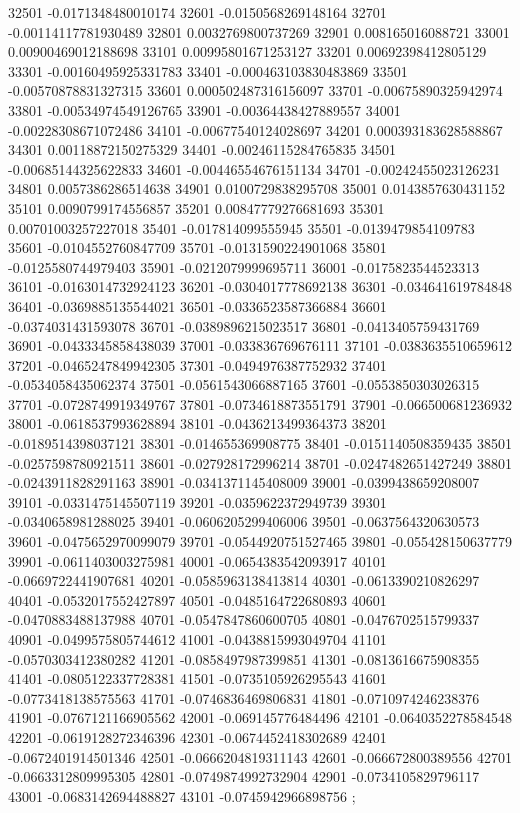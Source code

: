 {32501 -0.0171348480010174
32601 -0.0150568269148164
32701 -0.00114117781930489
32801 0.0032769800737269
32901 0.008165016088721
33001 0.00900469012188698
33101 0.00995801671253127
33201 0.00692398412805129
33301 -0.00160495925331783
33401 -0.000463103830483869
33501 -0.00570878831327315
33601 0.000502487316156097
33701 -0.00675890325942974
33801 -0.00534974549126765
33901 -0.00364438427889557
34001 -0.00228308671072486
34101 -0.00677540124028697
34201 0.000393183628588867
34301 0.00118872150275329
34401 -0.00246115284765835
34501 -0.00685144325622833
34601 -0.00446554676151134
34701 -0.00242455023126231
34801 0.0057386286514638
34901 0.0100729838295708
35001 0.0143857630431152
35101 0.0090799174556857
35201 0.00847779276681693
35301 0.00701003257227018
35401 -0.017814099555945
35501 -0.0139479854109783
35601 -0.0104552760847709
35701 -0.0131590224901068
35801 -0.0125580744979403
35901 -0.0212079999695711
36001 -0.0175823544523313
36101 -0.0163014732924123
36201 -0.0304017778692138
36301 -0.034641619784848
36401 -0.0369885135544021
36501 -0.0336523587366884
36601 -0.0374031431593078
36701 -0.0389896215023517
36801 -0.0413405759431769
36901 -0.0433345858438039
37001 -0.033836769676111
37101 -0.0383635510659612
37201 -0.0465247849942305
37301 -0.0494976387752932
37401 -0.0534058435062374
37501 -0.0561543066887165
37601 -0.0553850303026315
37701 -0.0728749919349767
37801 -0.0734618873551791
37901 -0.066500681236932
38001 -0.0618537993628894
38101 -0.0436213499364373
38201 -0.0189514398037121
38301 -0.014655369908775
38401 -0.0151140508359435
38501 -0.0257598780921511
38601 -0.027928172996214
38701 -0.0247482651427249
38801 -0.0243911828291163
38901 -0.0341371145408009
39001 -0.0399438659208007
39101 -0.0331475145507119
39201 -0.0359622372949739
39301 -0.0340658981288025
39401 -0.0606205299406006
39501 -0.0637564320630573
39601 -0.0475652970099079
39701 -0.0544920751527465
39801 -0.055428150637779
39901 -0.0611403003275981
40001 -0.0654383542093917
40101 -0.0669722441907681
40201 -0.0585963138413814
40301 -0.0613390210826297
40401 -0.0532017552427897
40501 -0.0485164722680893
40601 -0.0470883488137988
40701 -0.0547847860600705
40801 -0.0476702515799337
40901 -0.0499575805744612
41001 -0.0438815993049704
41101 -0.0570303412380282
41201 -0.0858497987399851
41301 -0.0813616675908355
41401 -0.0805122337728381
41501 -0.0735105926295543
41601 -0.0773418138575563
41701 -0.0746836469806831
41801 -0.0710974246238376
41901 -0.0767121166905562
42001 -0.069145776484496
42101 -0.0640352278584548
42201 -0.0619128272346396
42301 -0.0674452418302689
42401 -0.0672401914501346
42501 -0.0666204819311143
42601 -0.066672800389556
42701 -0.0663312809995305
42801 -0.0749874992732904
42901 -0.0734105829796117
43001 -0.0683142694488827
43101 -0.0745942966898756
};

